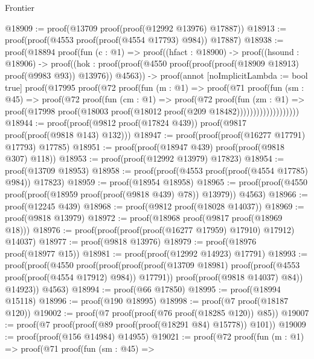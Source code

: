 \begin{lexlean}{Frontier}
\begin{coremodule}
@18909 := proof(@13709 proof(proof(@12992 @13976) @17887))
@18913 := proof(proof(@4553 proof(proof(@4554 @17793) @984)) @17887)
@18938 := proof(@18894
      proof(fun (c : @1) =>
        proof((hfact : @18900) ->
          proof((hsound : @18906) ->
            proof((hok : proof(proof(@4550
                    proof(proof(proof(@18909 @18913) proof(@9983 @93)) @13976))
                  @4563)) ->
              proof(annot [noImplicitLambda := bool true]
                proof(@17995
                    proof(@72
                        proof(fun (m : @1) =>
                          proof(@71
                              proof(fun (sm : @45) =>
                                proof(@72
                                    proof(fun (cm : @1) =>
                                      proof(@72
                                          proof(fun (zm : @1) =>
                                            proof(@17998
                                                proof(@18003
                                                    proof(@18012
                                                        proof(@209 @18482)))))))))))))))))))
@18944 := proof(proof(@9812 proof(@17824 @439)) proof(@9817 proof(proof(@9818 @143) @132)))
@18947 := proof(proof(proof(@16277 @17791) @17793) @17785)
@18951 := proof(proof(@18947 @439) proof(proof(@9818 @307) @118))
@18953 := proof(proof(@12992 @13979) @17823)
@18954 := proof(@13709 @18953)
@18958 := proof(proof(@4553 proof(proof(@4554 @17785) @984)) @17823)
@18959 := proof(@18954 @18958)
@18965 := proof(proof(@4550 proof(proof(@18959 proof(proof(@9818 @439) @78)) @13979)) @4563)
@18966 := proof(@12245 @439)
@18968 := proof(@9812 proof(@18028 @14037))
@18969 := proof(@9818 @13979)
@18972 := proof(@18968 proof(@9817 proof(@18969 @18)))
@18976 := proof(proof(proof(proof(@16277 @17959) @17910) @17912) @14037)
@18977 := proof(@9818 @13976)
@18979 := proof(@18976 proof(@18977 @15))
@18981 := proof(proof(@12992 @14923) @17791)
@18993 := proof(proof(@4550
        proof(proof(proof(proof(@13709 @18981)
                proof(proof(@4553 proof(proof(@4554 @17912) @984)) @17791))
              proof(proof(@9818 @14037) @84))
            @14923))
      @4563)
@18994 := proof(@66 @17850)
@18995 := proof(@18994 @15118)
@18996 := proof(@190 @18995)
@18998 := proof(@7 proof(@18187 @120))
@19002 := proof(@7 proof(proof(@76 proof(@18285 @120)) @85))
@19007 := proof(@7 proof(proof(@89 proof(proof(@18291 @84) @15778)) @101))
@19009 := proof(proof(@156 @14984) @14955)
@19021 := proof(@72
      proof(fun (m : @1) =>
        proof(@71
            proof(fun (sm : @45) =>

\end{coremodule}
\end{lexlean}
